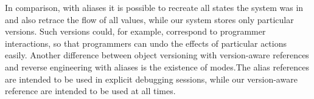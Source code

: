 In comparison, with aliases it is possible to recreate all states the system was in and also retrace the flow of all values, while our system stores only particular versions.
Such versions could, for example, correspond to programmer interactions, so that programmers can undo the effects of particular actions easily.
Another difference between object versioning with version-aware references and reverse engineering with aliases is the existence of modes.The alias references are intended to be used in explicit debugging sessions, while our version-aware reference are intended to be used at all times.





